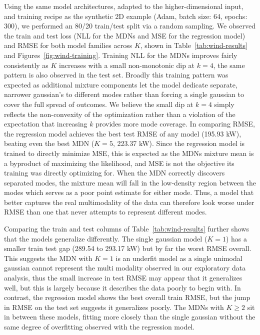 \documentclass[10pt]{article}
\begin{document}
Using the same model architectures, adapted to the higher-dimensional input, and training recipe as the synthetic 2D example (Adam, batch size: 64, epochs: 300), we performed an 80/20 train/test split via a random sampling.
We observed the train and test loss (NLL for the MDNs and MSE for the regression model) and RMSE for both model families across $K$, shown in Table~\ref{tab:wind-results} and Figures~\ref{fig:wind-training}.
Training NLL for the MDNs improves fairly consistently as $K$ increases with a small non-monotonic dip at $k=4$, the same pattern is also observed in the test set.
Broadly this training pattern was expected as additional mixture components let the model dedicate separate, narrower gaussian's to different modes rather than forcing a single gaussian to cover the full spread of outcomes.
We believe the small dip at $k=4$ simply reflects the non-convexity of the optimization rather than a violation of the expectation that increasing $k$ provides more mode coverage.
In comparing RMSE, the regression model achieves the best test RMSE of any model (195.93 kW), beating even the best MDN ($K=5$, 223.37 kW).
Since the regression model is trained to directly minimize MSE, this is expected as the MDNs mixture mean is a byproduct of maximizing the likelihood, and MSE is not the objective its training was directly optimizing for.
When the MDN correctly discovers separated modes, the mixture mean will fall in the low-density region between the modes which serves as a poor point estimate for either mode.
Thus, a model that better captures the real multimodality of the data can therefore look worse under RMSE than one that never attempts to represent different modes.

Comparing the train and test columns of Table~\ref{tab:wind-results} further shows that the models generalize differently.
The single gaussian model ($K=1$) has a smaller train test gap (289.54 to 293.17 kW) but by far the worst RMSE overall.
This suggests the MDN with $K=1$ is an underfit model as a single unimodal gaussian cannot represent the multi modality observed in our exploratory data analysis, thus the small increase in test RMSE may appear that it generalizes well, but this is largely because it describes the data poorly to begin with.
In contrast, the regression model shows the best overall train RMSE, but the jump in RMSE on the test set suggests it generalizes poorly.
The MDNs with $K\geq2$ sit in between these models, fitting more closely than the single gaussian without the same degree of overfitting observed with the regression model.
\end{document}
